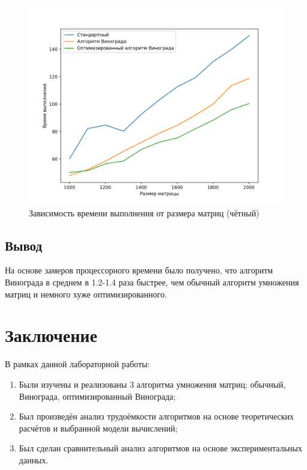 \documentclass[12pt]{report}
\begin{document}
\begin{figure}[h!p]
	\centering
	\includegraphics[scale = 0.6]{odd.png}
	\caption{Зависимость времени выполнения от размера матриц (чётный)}
	\label{timeOddGraph}
\end{figure}
\section{Вывод}

На основе замеров процессорного времени было получено, что алгоритм Винограда в среднем в 1.2-1.4 раза быстрее, чем обычный алгоритм умножения матриц и немного хуже оптимизированного.

\chapter*{Заключение}

В рамках данной лабораторной работы:

\begin{enumerate}
	\item Были изучены и реализованы 3 алгоритма умножения матриц: обычный, Винограда, оптимизированный Винограда;
	\item Был произведён анализ трудоёмкости алгоритмов на основе теоретических расчётов и выбранной модели вычислений;
	\item Был сделан сравнительный анализ алгоритмов на основе экспериментальных данных.
\end{enumerate}
\end{document}
